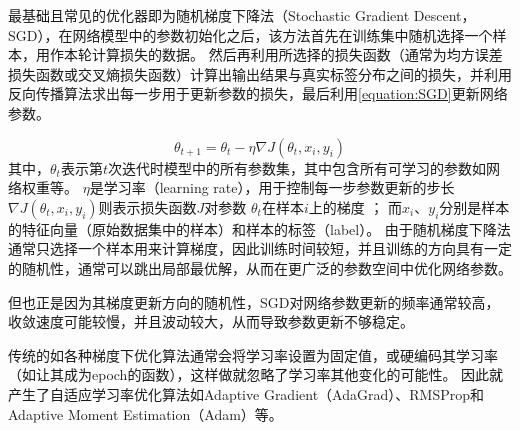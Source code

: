 最基础且常见的优化器即为随机梯度下降法（Stochastic Gradient Descent，SGD），在网络模型中的参数初始化之后，该方法首先在训练集中随机选择一个样本，用作本轮计算损失的数据。
然后再利用所选择的损失函数（通常为均方误差损失函数或交叉熵损失函数）计算出输出结果与真实标签分布之间的损失，并利用反向传播算法求出每一步用于更新参数的损失，最后利用\cref{equation:SGD}更新网络参数。

\begin{equation}
  \label{equation:SGD}
  \theta_{t+1} = \theta_{t} - \eta \nabla J(\theta_{t}, x_i, y_i)
\end{equation}
其中，$\theta_{t}$表示第$t$次迭代时模型中的所有参数集，其中包含所有可学习的参数如网络权重等。
$\eta$是学习率（learning rate），用于控制每一步参数更新的步长
$\nabla J(\theta_{t}, x_i, y_i)$则表示损失函数$J$对参数 $\theta_{t}$在样本$i$上的梯度 ；
而$x_i$、$y_i$分别是样本的特征向量（原始数据集中的样本）和样本的标签（label）。
由于随机梯度下降法通常只选择一个样本用来计算梯度，因此训练时间较短，并且训练的方向具有一定的随机性，通常可以跳出局部最优解，从而在更广泛的参数空间中优化网络参数。

但也正是因为其梯度更新方向的随机性，SGD对网络参数更新的频率通常较高，收敛速度可能较慢，并且波动较大，从而导致参数更新不够稳定。

传统的如各种梯度下优化算法通常会将学习率设置为固定值，或硬编码其学习率（如让其成为epoch的函数），这样做就忽略了学习率其他变化的可能性。
因此就产生了自适应学习率优化算法如Adaptive Gradient（AdaGrad）、RMSProp和Adaptive Moment Estimation（Adam）等。


